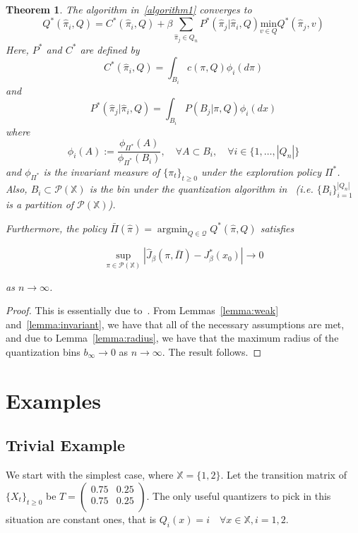 \documentclass{article}
\newtheorem{theorem}{Theorem}[section]
\DeclareMathOperator*{\argmin}{argmin}
\begin{document}
\begin{theorem}
    The algorithm in~\ref{algorithm1} converges to
    \[ Q^*(\hat{\pi}_i, Q) = C^*(\hat{\pi}_i, Q) + \beta \sum_{\hat{\pi}_j \in Q_n}P^*(\hat{\pi}_j|\hat{\pi}_i,Q)\underset{v \in Q}{\text{min}}Q^*(\hat{\pi}_j, v) \]
    Here, \(P^*\) and \(C^*\) are defined by
    \[ C^*(\hat{\pi}_i, Q) = \int_{B_i}c(\pi,Q)\phi_i(d \pi)\]
    and
    \[ P^*(\hat{\pi}_j|\hat{\pi}_i,Q) = \int_{B_i}P(B_j|\pi,Q)\phi_i(dx) \]
    where
    \[ \phi_i(A) := \frac{\phi_{\Pi^*}(A)}{\phi_{\Pi^*}(B_i)},\quad \forall A \subset B_i, \quad \forall i \in \{ 1,\ldots,|Q_n| \} \]
    and \( \phi_{\Pi^*} \) is the invariant measure of \( \{\pi_t\}_{t\ge0} \) under the exploration policy \( \Pi^* \). %
    Also, \( B_i \subset \mathcal{P}(\mathbb{X}) \) is the bin under the quantization algorithm in~\cite{Reznik} (i.e. \( \{B_i\}_{i=1}^{|Q_n|} \) is a partition of \( \mathcal{P}(\mathbb{X}) \)). %

    Furthermore, the policy \( \bar{\Pi}(\hat{\pi}) = \argmin_{Q \in \mathcal{Q}} Q^*(\hat{\pi},Q) \) satisfies

    \[ \sup_{\pi \in \mathcal{P}(\mathbb{X})}|\hat{J}_{\beta}(\pi, \bar{\Pi}) - J_{\beta}^*(x_0)| \to 0 \]

    as \( n \to \infty \).
\end{theorem}

\begin{proof}
    This is essentially due to~\cite[Theorem 3.2 and Corollary 3.3]{Kara}. From Lemmas~\ref{lemma:weak} and~\ref{lemma:invariant}, we have that all of the necessary assumptions are met, and due to Lemma~\ref{lemma:radius}, we have that the maximum radius of the quantization bins \( b_{\infty} \to 0 \) as \( n \to \infty \). The result follows.
\end{proof}

\section{Examples}
\subsection{Trivial Example}
We start with the simplest case, where \( \mathbb{X} = \{1, 2\} \). Let the transition matrix of \( \{ X_t \}_{t\ge0} \) be \( T = \begin{pmatrix} 0.75 & 0.25 \\ 0.75 & 0.25 \\ \end{pmatrix} \). The only useful quantizers to pick in this situation are constant ones, that is \( Q_i(x) = i \quad \forall x\in\mathbb{X}, i=1,2 \). %
\end{document}
